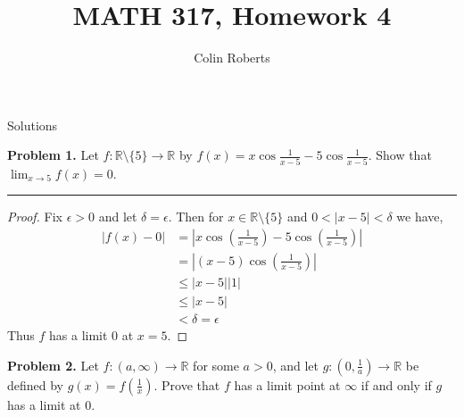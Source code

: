 \documentclass[leqno]{article}
\author{Colin Roberts}
\title{MATH 317, Homework 4}
\theoremstyle{nonumberplain}
\newtheorem{proof}{Proof}
\begin{document}
\maketitle
\begin{large}
\begin{center}
Solutions
\end{center}
\end{large}
\pagebreak

\noindent\textbf{Problem 1.} Let $f \colon \mathbb{R} \setminus \{5\} \to \mathbb{R}$ by $f(x) = x \cos \frac{1}{x-5}-5 \cos \frac{1}{x-5}$.  Show that $\lim _{x\to 5} f(x)=0$.

\noindent\rule[0.5ex]{\linewidth}{1pt}

\begin{proof}
Fix $\epsilon >0$ and let $\delta = \epsilon$.  Then for $x\in \mathbb{R}\setminus\{5\}$ and $0<|x-5|<\delta$ we have,
\begin{align*}
|f(x)-0|&=\left|x\cos\left(\frac{1}{x-5}\right) -5\cos \left(\frac{1}{x-5}\right)\right|\\
&=\left|(x-5)\cos\left(\frac{1}{x-5}\right)\right|\\
&\leq |x-5||1|\\
&\leq|x-5|\\
&< \delta = \epsilon
\end{align*}
Thus $f$ has a limit $0$ at $x=5$. 
\end{proof}


\pagebreak



\noindent\textbf{Problem 2.} Let $f\colon (a,\infty) \to \mathbb{R}$ for some $a>0$, and let $g \colon (0,\frac{1}{a}) \to \mathbb{R}$ be defined by $g(x)=f(\frac{1}{x})$. Prove that $f$ has a limit point at $\infty $ if and only if $g$ has a limit at $0$. 
\end{document}
